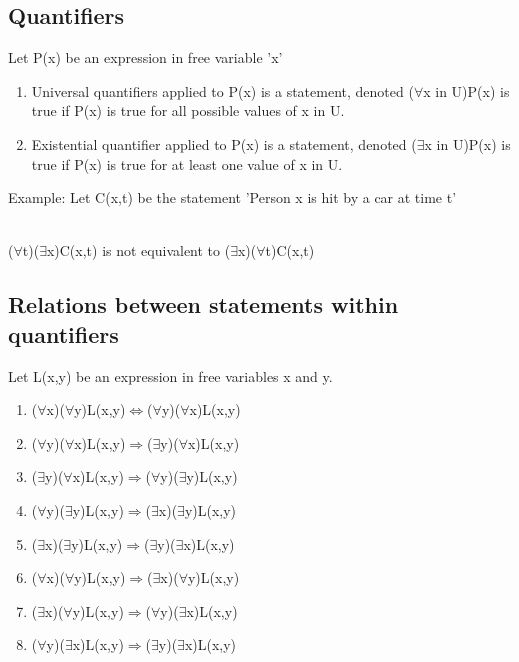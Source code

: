 \documentclass[]{article}
\begin{document}
\subsection{Quantifiers}
Let P(x) be an expression in free variable 'x'
	\begin{enumerate}
		\item Universal quantifiers applied to P(x) is a statement, denoted ($\forall$x in U)P(x) is true if P(x) is true for all possible values of x in U.
		\item Existential quantifier applied to P(x) is a statement, denoted ($\exists$x in U)P(x) is true if P(x) is true for at least one value of x in U. 
		 
	\end{enumerate}
	Example: Let C(x,t) be the statement 'Person x is hit by a car at time t'
	\\ \\ \centerline{($\forall$t)($\exists$x)C(x,t) is not equivalent to ($\exists$x)($\forall$t)C(x,t)}  
\subsection{Relations between statements within quantifiers}
Let L(x,y) be an expression in free variables x and y.
\begin{enumerate}
	\item ($\forall$x)($\forall$y)L(x,y)$\Leftrightarrow$($\forall$y)($\forall$x)L(x,y)
	\item ($\forall$y)($\forall$x)L(x,y)$\Rightarrow$($\exists$y)($\forall$x)L(x,y)
	\item ($\exists$y)($\forall$x)L(x,y)$\Rightarrow$($\forall$y)($\exists$y)L(x,y)
	\item ($\forall$y)($\exists$y)L(x,y)$\Rightarrow$($\exists$x)($\exists$y)L(x,y)
	\item ($\exists$x)($\exists$y)L(x,y)$\Rightarrow$($\exists$y)($\exists$x)L(x,y)
	\item ($\forall$x)($\forall$y)L(x,y)$\Rightarrow$($\exists$x)($\forall$y)L(x,y)\item ($\exists$x)($\forall$y)L(x,y)$\Rightarrow$($\forall$y)($\exists$x)L(x,y)\item
	($\forall$y)($\exists$x)L(x,y)$\Rightarrow$($\exists$y)($\exists$x)L(x,y)  
\end{enumerate}
	
\end{document}
